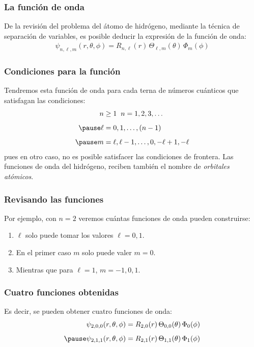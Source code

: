 \documentclass[12pt]{beamer}
\begin{document}
\begin{frame}
\frametitle{La función de onda}
De la revisión del problema del átomo de hidrógeno, mediante la técnica de separación de variables, es posible deducir la expresión de la función de onda:
\pause
\begin{align}
\psi_{n, \ell, m} (r, \theta, \phi) = R _{n, \ell} (r) \, \Theta_{\ell, m} (\theta) \, \Phi_{m} (\phi)
\label{ec:ecuacion_07_25}
\end{align}
\end{frame}
\begin{frame}
\frametitle{Condiciones para la función}
Tendremos esta función de onda para cada terna de números cuánticos que satisfagan las condiciones:
\pause
\begin{eqnarray}
\begin{aligned}
n &\geq 1 \hspace{0.2cm} n = 1, 2, 3, \ldots \\[0.5em] \pause
\ell &= 0, 1, \ldots, (n - 1) \\[0.5em] \pause
m &= \ell, \ell - 1, \ldots, 0, - \ell + 1, -\ell
\end{aligned}
\label{eq:ecuacion_07_26}
\end{eqnarray}
pues en otro caso, no es posible satisfacer las condiciones de frontera. \pause Las funciones de onda del hidrógeno, reciben también el nombre de \emph{orbitales atómicos}.
\end{frame}
\begin{frame}
\frametitle{Revisando las funciones}
Por ejemplo, con $n = 2$ \pause veremos cuántas funciones de onda pueden construirse:
\pause
{}
\begin{enumerate}[<+->]
\item $\ell$ solo puede tomar los valores $\ell = 0, 1$.
\item En el primer caso $m$ solo puede valer $m = 0$.
\item Mientras que para $\ell = 1$, $m = -1, 0, 1$.
\end{enumerate}
\end{frame}
\begin{frame}
\frametitle{Cuatro funciones obtenidas}
Es decir, se pueden obtener cuatro funciones de onda:
\pause
\begin{eqnarray*}
\begin{aligned}
\psi_{2, 0, 0} (r, \theta, \phi) &= R_{2, 0} (r) \, \Theta_{0, 0} (\theta) \, \Phi_{0} (\phi) \\[0.5em] \pause
\psi_{2, 1, 1} (r, \theta, \phi) &= R_{2, 1} (r) \, \Theta_{1, 1} (\theta) \, \Phi_{1} (\phi)
\end{aligned}
\end{eqnarray*}
\end{frame}
\end{document}
